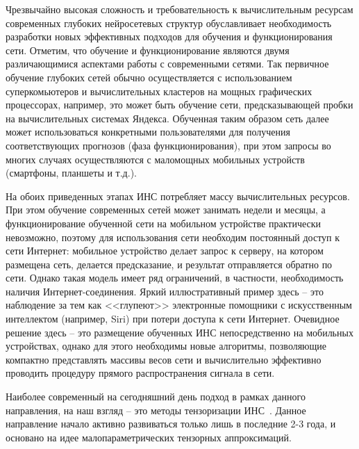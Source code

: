 \documentclass[a4paper,12pt,russian]{article} %
\begin{document}
Чрезвычайно высокая сложность и требовательность к вычислительным ресурсам современных глубоких нейросетевых структур обуславливает необходимость разработки новых эффективных  подходов для обучения и функционирования сети.
Отметим, что обучение и функционирование являются двумя различающимися аспектами работы с современными сетями.
Так первичное обучение глубоких сетей обычно осуществляется с использованием суперкомьютеров и вычислительных кластеров на мощных графических процессорах, например, это может быть обучение сети, предсказывающей пробки на вычислительных системах Яндекса.
Обученная таким образом сеть далее может использоваться конкретными пользователями для получения соответствующих прогнозов (фаза функционирования), при этом запросы во многих случаях осуществляются с маломощных мобильных устройств (смартфоны, планшеты и т.д.).

На обоих приведенных этапах ИНС потребляет массу вычислительных ресурсов.
При этом обучение современных сетей может занимать недели и месяцы, а функционирование обученной сети на мобильном устройстве практически невозможно, поэтому для использования сети необходим постоянный доступ к сети Интернет: мобильное устройство делает запрос к серверу, на котором размещена сеть, делается предсказание, и результат отправляется обратно по сети.
Однако такая модель имеет ряд ограничений, в частности, необходимость наличия Интернет-соединения.
Яркий иллюстративный пример здесь -- это наблюдение за тем как <<глупеют>> электронные помощники с искусственным интеллектом (например, Siri) при потери доступа к сети Интернет.
Очевидное решение здесь -- это размещение обученных ИНС непосредственно на мобильных устройствах, однако для этого необходимы новые алгоритмы, позволяющие компактно представлять массивы весов сети и вычислительно эффективно проводить процедуру прямого распространения сигнала в сети.

Наиболее современный на сегодняшний день подход в рамках данного направления, на наш взгляд -- это методы тензоризации ИНС~\cite{novikov2015tensorizing, lebedev2014speeding, socher2013reasoning, yu2012large, yu2013deep, kim2015compression, janzamin2015beating}. 
Данное направление начало активно развиваться только лишь в последние 2-3 года, и основано на идее малопараметрических тензорных аппроксимаций.
\end{document}
